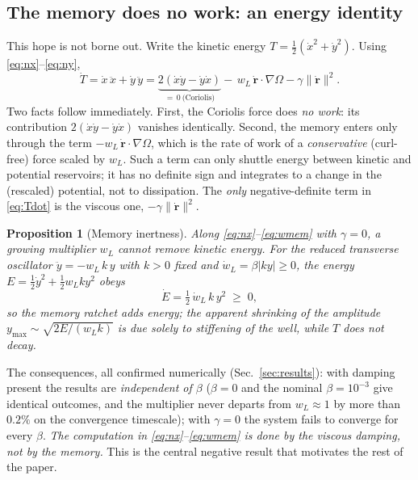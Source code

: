 \documentclass[10pt,twocolumn]{article}
\newtheorem{proposition}{Proposition}
\begin{document}
\subsection{The memory does no work: an energy identity}

This hope is not borne out. Write the kinetic energy
$T=\tfrac12(\dot x^2+\dot y^2)$. Using \eqref{eq:nx}--\eqref{eq:ny},
\begin{equation}
  \dot T=\dot x\,\ddot x+\dot y\,\ddot y
   = \underbrace{2(\dot x\dot y-\dot y\dot x)}_{=\,0\ \text{(Coriolis)}}
     -\,w_L\,\dot{\mathbf r}\!\cdot\!\nabla\Omega
     -\gamma\lVert\dot{\mathbf r}\rVert^2 .
  \label{eq:Tdot}
\end{equation}
Two facts follow immediately. First, the Coriolis force does \emph{no work}:
its contribution $2(\dot x\dot y-\dot y\dot x)$ vanishes identically. Second,
the memory enters only through the term $-w_L\,\dot{\mathbf r}\!\cdot\!\nabla\Omega$,
which is the rate of work of a \emph{conservative} (curl-free) force scaled by
$w_L$. Such a term can only shuttle energy between kinetic and potential
reservoirs; it has no definite sign and integrates to a change in the (rescaled)
potential, not to dissipation. The \emph{only} negative-definite term in
\eqref{eq:Tdot} is the viscous one, $-\gamma\lVert\dot{\mathbf r}\rVert^2$.

\begin{proposition}[Memory inertness]\label{prop:inert}
Along \eqref{eq:nx}--\eqref{eq:wmem} with $\gamma=0$, a growing multiplier
$w_L$ cannot remove kinetic energy. For the reduced transverse oscillator
$\ddot y=-w_L\,k\,y$ with $k>0$ fixed and $\dot w_L=\beta\lvert k y\rvert\ge0$,
the energy $E=\tfrac12\dot y^2+\tfrac12 w_L k y^2$ obeys
\begin{equation}
  \dot E=\tfrac12\,\dot w_L\,k\,y^2\;\ge\;0 ,
\end{equation}
so the memory ratchet \emph{adds} energy; the apparent shrinking of the
amplitude $y_{\max}\sim\sqrt{2E/(w_Lk)}$ is due solely to stiffening of the
well, while $T$ does not decay.
\end{proposition}

\noindent The consequences, all confirmed numerically (Sec.~\ref{sec:results}):
with damping present the results are \emph{independent of $\beta$}
($\beta=0$ and the nominal $\beta=10^{-3}$ give identical outcomes, and the
multiplier never departs from $w_L\approx1$ by more than $0.2\%$ on the
convergence timescale); with $\gamma=0$ the system fails to converge for every
$\beta$. \emph{The computation in \eqref{eq:nx}--\eqref{eq:wmem} is done by the
viscous damping, not by the memory.} This is the central negative result that
motivates the rest of the paper.
\end{document}
